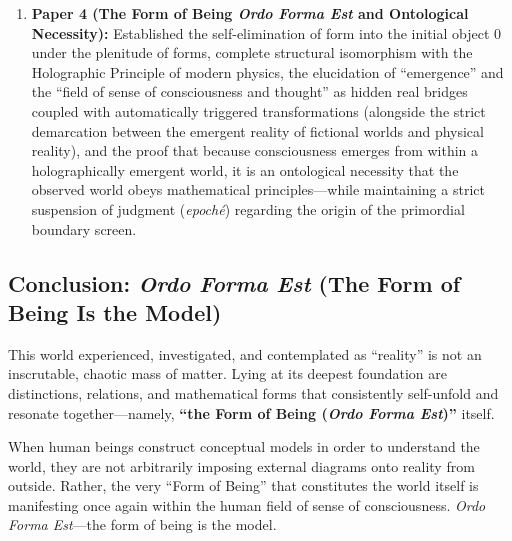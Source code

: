 \documentclass[11pt,a4paper]{article}
\theoremstyle{definition}
\theoremstyle{plain}
\begin{document}
\begin{enumerate}
    \item \textbf{Paper 4 (The Form of Being \textit{Ordo Forma Est} and Ontological Necessity):} Established the self-elimination of form into the initial object $0$ under the plenitude of forms, complete structural isomorphism with the Holographic Principle of modern physics, the elucidation of ``emergence'' and the ``field of sense of consciousness and thought'' as hidden real bridges coupled with automatically triggered transformations (alongside the strict demarcation between the emergent reality of fictional worlds and physical reality), and the proof that because consciousness emerges from within a holographically emergent world, it is an ontological necessity that the observed world obeys mathematical principles---while maintaining a strict suspension of judgment (\textit{epoch\'e}) regarding the origin of the primordial boundary screen.
\end{enumerate}

\subsection{Conclusion: \textit{Ordo Forma Est} (The Form of Being Is the Model)}
This world experienced, investigated, and contemplated as ``reality'' is not an inscrutable, chaotic mass of matter. Lying at its deepest foundation are distinctions, relations, and mathematical forms that consistently self-unfold and resonate together---namely, \textbf{``the Form of Being (\textit{Ordo Forma Est})''} itself.

When human beings construct conceptual models in order to understand the world, they are not arbitrarily imposing external diagrams onto reality from outside. Rather, the very ``Form of Being'' that constitutes the world itself is manifesting once again within the human field of sense of consciousness. \textit{Ordo Forma Est}---the form of being is the model.
\end{document}
